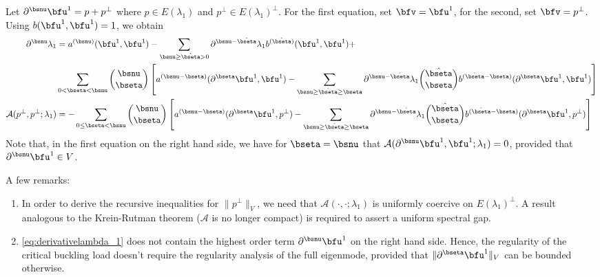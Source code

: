 Let $\partial^{\bsnu} \bfu^1 = p + p^\bot$ where $p \in E(\lambda_1)$ and $p^\bot  \in  E(\lambda_1)^{\bot} $.
For the first equation, set $ \bfv = \bfu^1$, for the second, set $\bfv = p^\bot$. Using $ b(\bfu^1, \bfu^1) =1 $, we obtain
\begin{align}
\label{eq:derivativelambda_1}
    \partial^{\bsnu}  \lambda_1  &= a^{(\bsnu)} (\bfu^1,\bfu^1)  - \sum_{\bsnu \geq \hat \bseta > 0 } \partial^{\bsnu - \hat \bseta } \lambda_1  b^{(\hat \bseta)} ( \bfu^1,\bfu^1)  +  \\
    & \sum_{0 < \bseta < \bsnu} \binom{\bsnu}{\bseta} \left[ a^{(\bsnu-\bseta)}(\partial^{\bseta}\bfu^1, \bfu^1) - \sum_{\bsnu \geq \hat \bseta \geq \bseta} \partial^{\bsnu -\hat \bseta} \lambda_1  \binom{\hat \bseta}{\bseta} b^{(\hat \bseta - \bseta )} (\partial^{\bseta} \bfu^1, \bfu^1) \right] \\
    \label{eq:derivativeu1}
    \mathcal{A}(p^\bot, p^\bot;\lambda_1)&=  - \sum_{0 \leq \bseta < \bsnu} \binom{\bsnu}{\bseta} \left[ a^{(\bsnu-\bseta)}(\partial^{\bseta}\bfu^1, p^\bot) - \sum_{\bsnu \geq \hat \bseta \geq \bseta} \partial^{\bsnu -\hat \bseta} \lambda_1  \binom{\hat \bseta}{\bseta} b^{(\hat \bseta - \bseta )} (\partial^{\bseta} \bfu^1, p^\bot) \right]
    \end{align}
    Note that, in the first equation on the right hand side, we have for $\bseta = \bsnu$ that
    $ \mathcal{A}(\partial^{\bsnu} \bfu^1, \bfu^1;\lambda_1) = 0 $, provided that  $ \partial^{\bsnu} \bfu^1 \in V$. 

    \begin{remark}
    A few remarks:
    \begin{enumerate}
        \item  In order to derive the recursive inequalities for %
        $ \|p^\bot\|_V$, we need that $\mathcal{A}(\cdot, \cdot;\lambda_1)$ is uniformly coercive on $E(\lambda_1)^{\bot}$. A result analogous to the Krein-Rutman theorem ($\mathcal{A}$ is no longer compact) is required to assert a uniform spectral gap.
        \item \eqref{eq:derivativelambda_1} does not contain the highest order term $\partial^{\bsnu} \bfu^1$ on the right hand side. Hence, the regularity of the critical buckling load doesn't require the regularity analysis of the full eigenmode, provided that $ \|\partial^{\bseta} \bfu^1 \|_V$ can be bounded otherwise. 
    \end{enumerate}
    \end{remark}

